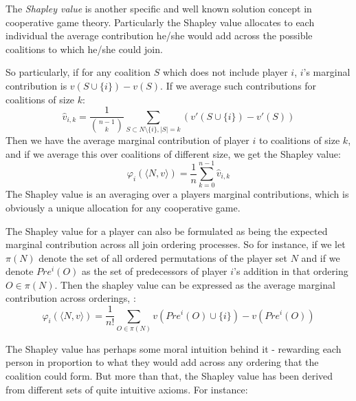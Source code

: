 The \textit{Shapley value} is another specific and well known solution concept in cooperative game theory.
Particularly the Shapley value allocates to each individual the average contribution he/she would add across the possible coalitions to which he/she could join.

So particularly, if for any coalition $S$ which does not include player $i$, $i$'s marginal contribution is $v(S\cup\{i\}) - v(S)$. If we average such contributions for coalitions of size $k$:
\begin{equation}\label{eq:shapley_value2}
\hat{v}_{i,k} = \frac{1}{\binom{n-1}{k}}\sum_{S\subset N\setminus \{ i\} , |S|=k} %
(v'(S\cup\{i\})-v'(S))
\end{equation}
Then we have the average marginal contribution of player $i$ to coalitions of size $k$, and if we average this over coalitions of different size, we get the Shapley value:
\begin{equation}\label{shap2} \varphi_i(\langle N,v\rangle) = \frac{1}{n}\sum_{k=0}^{n-1}\hat{v}_{i,k} \end{equation}
The Shapley value is an averaging over a players marginal contributions, which is obviously a unique allocation for any cooperative game.

The Shapley value for a player can also be formulated as being the expected marginal contribution across all join ordering processes.
So for instance, if we let $\pi(N)$ denote the set of all ordered permutations of the player set $N$ and if we denote $Pre^i(O)$ as the set of predecessors of player $i$'s addition in that ordering $O\in \pi(N)$. Then the shapley value can be expressed as the average marginal contribution across orderings, \cite{weber_1988}:
\begin{equation}
    \varphi_i(\langle N,v\rangle) = \frac{1}{n!}\sum_{O\in\pi(N)}v(Pre^i(O)\cup\{i\})-v(Pre^i(O))
\end{equation}

The Shapley value has perhaps some moral intuition behind it - rewarding each person in proportion to what they would add across any ordering that the coalition could form.
But more than that, the Shapley value has been derived from different sets of quite intuitive axioms.
For instance:

